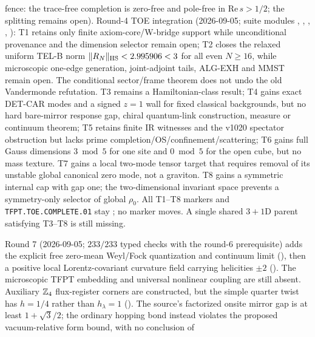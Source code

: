 \begin{keybox}
fence: the trace-free completion is zero-free and pole-free in $\mathrm{Re}\,s>1/2$; the splitting remains open).
Round-4 TOE integration (2026-09-05; suite modules
,
,
,
,
):
T1 retains only finite axiom-core/W-bridge support while unconditional provenance and
the dimension selector remain open; T2 closes the relaxed uniform TEL-B norm
$\|R_N\|_{\rm HS}<2.995906<3$ for all even $N\ge16$, while microscopic
one-edge generation, joint-adjoint tails, ALG-EXH and MMST remain open.
The conditional sector/frame theorem does not undo the old Vandermonde refutation.
T3 remains a Hamiltonian-class result; T4 gains exact DET-CAR modes and a signed
$z=1$ wall for fixed classical backgrounds, but no hard bare-mirror response
gap, chiral quantum-link construction, measure or continuum theorem;
T5 retains finite IR witnesses and the v1020 spectator obstruction but lacks
prime completion/OS/confinement/scattering;
T6 gains full Gauss dimensions $3\bmod5$ for one site and $0\bmod5$ for the
open cube, but no mass texture. T7 gains a local two-mode tensor target that
requires removal of its unstable global canonical zero mode, not a graviton.
T8 gains a symmetric internal cap with gap one; the two-dimensional invariant
space prevents a symmetry-only selector of global $\rho_0$. All T1--T8
markers and \texttt{TFPT.TOE.COMPLETE.01} stay \mO; no marker moves.  A single shared
$3{+}1$D parent satisfying T3--T8 is still missing.
\par\smallskip\noindent
Round 7 (2026-09-05; $233/233$ typed checks with the round-6 prerequisite)
adds the explicit free zero-mean Weyl/Fock quantization and continuum limit
(), then a positive local
Lorentz-covariant curvature field carrying helicities $\pm2$
(). The microscopic TFPT embedding
and universal nonlinear coupling are still absent. Auxiliary $\mathbb{Z}_4$
flux-register corners are constructed, but the simple quarter twist has
$h=1/4$ rather than $h_\lambda=1$
(). The source's factorized onsite
mirror gap is at least $1+\sqrt3/2$; the ordinary hopping bond instead
violates the proposed vacuum-relative form bound, with no conclusion of

\end{keybox}

